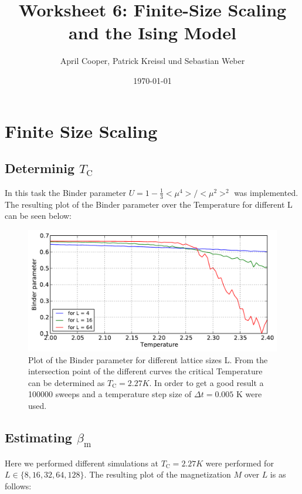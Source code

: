 \documentclass[12pt,a4paper]{scrartcl}
\author{April Cooper, Patrick Kreissl und Sebastian Weber}
\title{Worksheet 6: Finite-Size Scaling and the Ising Model}
\date{\today}
\begin{document}
\maketitle
\tableofcontents
\newpage

\section{Finite Size Scaling}

\subsection{Determinig $T_\text{C}$}

In this task the Binder parameter $ U = 1 - \frac{1}{3} <\mu^4>/<\mu^2>^2$ was implemented. The resulting plot of the Binder parameter over the Temperature for different L can be seen below:

\begin{figure}[H]
\includegraphics[width=16.0cm]{../plots/2binder_01.pdf}
\caption{Plot of the Binder parameter for different lattice sizes L. From the intersection point of the different curves the critical Temperature can be determined as $T_\text{C} = 2.27 K$. In order to get a good result a 100000 sweeps and a temperature step size of $\Delta t = 0.005$ K were used.}
\end{figure}

\subsection{Estimating $\beta_\text{m}$}

Here we performed different simulations at $T_\text{C} = 2.27 K$ were performed for $L \in \lbrace 8, 16, 32, 64, 128 \rbrace$. The resulting plot of the magnetization $M$ over $L$ is as follows:
\end{document}
